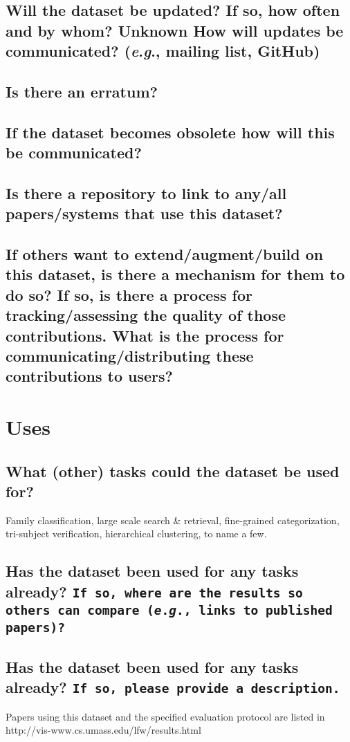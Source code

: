\documentclass[a4paper,9pt]{extarticle}
\newcommand{\eg}{\textit{e}.\textit{g}., }
\begin{document}
\begin{multicols}{2}
\subsection*{Will the dataset be updated? If so, how often and by whom? Unknown
How will updates be communicated? (\eg mailing list, GitHub)}
\noindent
\subsection*{Is there an erratum?}
\noindent
\subsection*{If the dataset becomes obsolete how will this be communicated?}
\noindent
\subsection*{Is there a repository to link to any/all papers/systems that use this dataset?}
\noindent
\subsection*{If others want to extend/augment/build on this dataset, is there a mechanism for them to do so? If so, is there a process for tracking/assessing the quality of those contributions. What is the process for communicating/distributing these contributions to users?}
\noindent

\section*{Uses}
\subsection*{What (other) tasks could the dataset be used for?}
\noindent Family classification, large scale search \& retrieval, fine-grained categorization, tri-subject verification, hierarchical clustering, to name a few.


\subsection*{Has the dataset been used for any tasks already? \texttt{If so, where are the results so others can compare (\eg links to published papers)?}}
\noindent 
\subsection*{Has the dataset been used for any tasks already? \texttt{If so, please provide a description.}}
Papers using this dataset and the specified evaluation protocol are
listed in http://vis-www.cs.umass.edu/lfw/results.html

\end{multicols}
\end{document}
